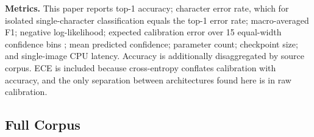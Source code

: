 \textbf{Metrics.} This paper reports top-1 accuracy; character error rate, which
for isolated single-character classification equals the top-1 error
rate; macro-averaged F1; negative log-likelihood; expected calibration
error over 15 equal-width confidence bins \citep{ref52}; mean predicted confidence;
parameter count; checkpoint size; and single-image CPU latency. Accuracy
is additionally disaggregated by source corpus. ECE is included because cross-entropy conflates calibration with accuracy, and the only separation between architectures found here is in raw calibration.


\hypertarget{full-corpus}{%
\subsection{Full Corpus}\label{full-corpus}}


